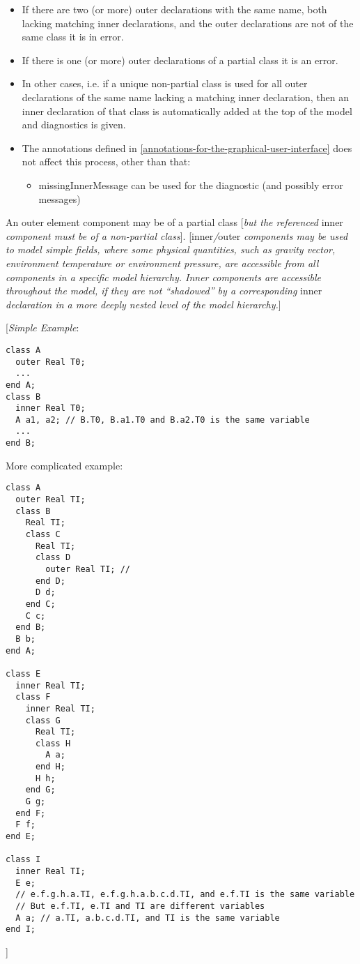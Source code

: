 \begin{itemize}
\item
  If there are two (or more) outer declarations with the same name, both
  lacking matching inner declarations, and the outer declarations are
  not of the same class it is in error.
\item
  If there is one (or more) outer declarations of a partial class it is
  an error.
\item
  In other cases, i.e. if a unique non-partial class is used for all
  outer declarations of the same name lacking a matching inner
  declaration, then an inner declaration of that class is automatically
  added at the top of the model and diagnostics is given.
\item
  The annotations defined in \ref{annotations-for-the-graphical-user-interface} does not affect this process,
  other than that:

  \begin{itemize}
  \item
    missingInnerMessage can be used for the diagnostic (and possibly
    error messages)
  \end{itemize}
\end{itemize}

An outer element component may be of a partial class {[}\emph{but the
referenced} inner \emph{component must be of a non-partial class}{]}.
{[}inner\emph{/}outer \emph{components may be used to model simple
fields, where some physical quantities, such as gravity vector,
environment temperature or environment pressure, are accessible from all
components in a specific model hierarchy. Inner components are
accessible throughout the model, if they are not ``shadowed'' by a
corresponding} inner \emph{declaration in a more deeply nested level of
the model hierarchy.}{]}

{[}\emph{Simple Example}:
\begin{lstlisting}[language=modelica]
class A
  outer Real T0;
  ...
end A;
class B
  inner Real T0;
  A a1, a2; // B.T0, B.a1.T0 and B.a2.T0 is the same variable
  ...
end B;
\end{lstlisting}
More complicated example:
\begin{lstlisting}[language=modelica]
class A
  outer Real TI;
  class B
    Real TI;
    class C
      Real TI;
      class D
        outer Real TI; //
      end D;
      D d;
    end C;
    C c;
  end B;
  B b;
end A;

class E
  inner Real TI;
  class F
    inner Real TI;
    class G
      Real TI;
      class H
        A a;
      end H;
      H h;
    end G;
    G g;
  end F;
  F f;
end E;

class I
  inner Real TI;
  E e;
  // e.f.g.h.a.TI, e.f.g.h.a.b.c.d.TI, and e.f.TI is the same variable
  // But e.f.TI, e.TI and TI are different variables
  A a; // a.TI, a.b.c.d.TI, and TI is the same variable
end I;
\end{lstlisting}
{]}


